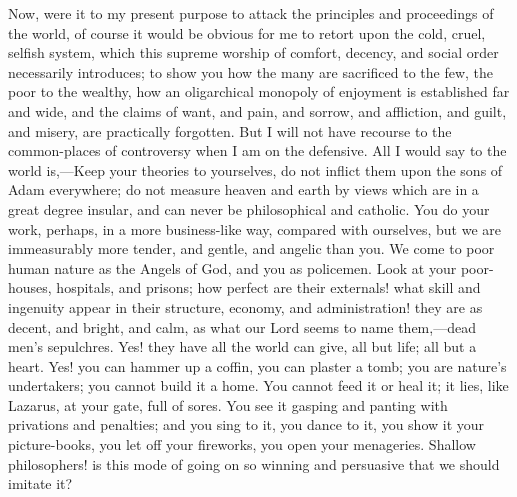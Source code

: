 Now, were it to my present purpose to attack the principles and
proceedings of the world, of course it would be obvious for me to
retort upon the cold, cruel, selfish system, which this supreme
worship of comfort, decency, and social order necessarily introduces;
to show you how the many are sacrificed to the few, the poor to the
wealthy, how an oligarchical monopoly of enjoyment is established far
and wide, and the claims of want, and pain, and sorrow, and
affliction, and guilt, and misery, are practically forgotten. But I
will not have recourse to the common-places of controversy when I am
on the defensive. All I would say to the world is,—Keep your
theories to yourselves, do not inflict them upon the sons of Adam
everywhere; do not measure heaven and earth by views which are in a
great degree insular, and can never be philosophical and catholic. You
do your work, perhaps, in a more business-like way, compared with
ourselves, but we are immeasurably more tender, and gentle, and
angelic than you. We come to poor human nature as the Angels of God,
and you as policemen. Look at your poor-houses, hospitals, and
prisons; how perfect are their externals! what skill and ingenuity
appear in their structure, economy, and administration! they are as
decent, and bright, and calm, as what our Lord seems to name them,—dead
men's sepulchres. Yes! they have all the world can give, all but life;
all but a heart. Yes! you can hammer up a coffin, you can plaster a
tomb; you are nature's undertakers; you cannot build it a home. You
cannot feed it or heal it; it lies, like Lazarus, at your gate, full
of sores. You see it gasping and panting with privations and
penalties; and you sing to it, you dance to it, you show it your
picture-books, you let off your fireworks, you open your menageries.
Shallow philosophers! is this mode of going on so winning and
persuasive that we should imitate it?

